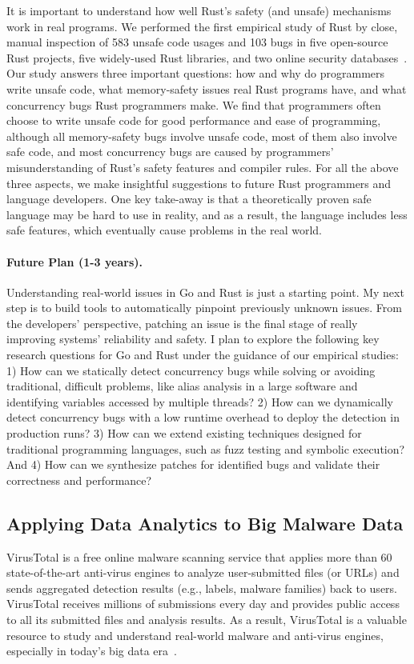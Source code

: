 \documentclass[10pt]{article}
\begin{document}
It is important to understand how well Rust’s safety (and
unsafe) mechanisms work in real programs. We performed
the first empirical study of Rust by close, manual inspection of 583 unsafe code usages 
and 103 bugs in five open-source Rust projects, five widely-used Rust libraries, and two
online security databases~\cite{sosp-boqin,yu2019fearless}. Our study answers three important 
questions: how and why do programmers write unsafe
code, what memory-safety issues real Rust programs have,
and what concurrency bugs Rust programmers make. 
We find that programmers often choose to write unsafe code for good performance 
and ease of programming, although all memory-safety bugs involve unsafe code, 
most of them also involve safe code, and 
most concurrency bugs are caused by programmers' misunderstanding of Rust's safety features 
and compiler rules. 
For all the above three aspects, we make insightful suggestions 
to future Rust programmers and language developers. 
One key take-away is that a theoretically proven safe language may be hard to 
use in reality, and as a result, the language 
includes less safe features, which eventually cause
problems in the real world.

\vspace{-.1in}
\paragraph{Future Plan (1-3 years).}
Understanding real-world issues in Go and Rust is just a starting point.
My next step is to build tools to automatically pinpoint previously unknown issues. 
From the developers' perspective, patching an issue is the final 
stage of really improving systems' reliability and safety. 
I plan to explore the following key research questions for Go and Rust 
under the guidance of our empirical studies: 
1) How can we statically detect concurrency bugs
while solving or avoiding traditional, difficult problems, 
like alias analysis in a large software
and identifying variables accessed by multiple threads?
2) How can we dynamically detect concurrency bugs with a low 
runtime overhead to deploy the detection in production runs?
3) How can we extend existing techniques designed for traditional programming languages, 
such as fuzz testing and symbolic execution?
And 4) How can we synthesize patches for identified bugs and validate 
their correctness and performance?


\vspace{-.1in}
\subsection{Applying Data Analytics to Big Malware Data}
VirusTotal is a free online malware scanning service that applies 
more than 60 state-of-the-art anti-virus engines to analyze user-submitted files (or URLs)
and sends aggregated detection results (e.g., labels, malware families) back to users. 
VirusTotal receives millions of submissions every day and 
provides public access to all its submitted files and analysis results.
As a result, VirusTotal is a valuable resource to study and understand real-world malware 
and anti-virus engines, especially in today's big data era~\cite{Song16ApSys}.  
\end{document}
